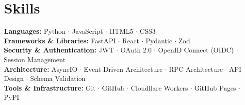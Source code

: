 \section{Skills}

\noindent
\textbf{Languages:} Python $\cdot$ JavaScript $\cdot$ HTML5 $\cdot$ CSS3 \\[2pt]
\textbf{Frameworks \& Libraries:} FastAPI $\cdot$ React $\cdot$ Pydantic $\cdot$ Zod \\[2pt]
\textbf{Security \& Authentication:} JWT $\cdot$ OAuth 2.0 $\cdot$ OpenID Connect (OIDC) $\cdot$ Session Management \\[2pt]
\textbf{Architecture:} AsyncIO $\cdot$ Event-Driven Architecture $\cdot$ RPC Architecture $\cdot$ API Design $\cdot$ Schema Validation \\[2pt]
\textbf{Tools \& Infrastructure:} Git $\cdot$ GitHub $\cdot$ Cloudflare Workers $\cdot$ GitHub Pages $\cdot$ PyPI
